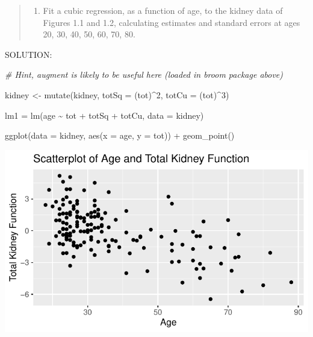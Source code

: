 \documentclass[
]{article}
\newenvironment{Shaded}{\begin{snugshade}}{\end{snugshade}}
\newcommand{\AttributeTok}[1]{\textcolor[rgb]{0.77,0.63,0.00}{#1}}
\newcommand{\CommentTok}[1]{\textcolor[rgb]{0.56,0.35,0.01}{\textit{#1}}}
\newcommand{\DecValTok}[1]{\textcolor[rgb]{0.00,0.00,0.81}{#1}}
\newcommand{\FunctionTok}[1]{\textcolor[rgb]{0.00,0.00,0.00}{#1}}
\newcommand{\NormalTok}[1]{#1}
\newcommand{\OtherTok}[1]{\textcolor[rgb]{0.56,0.35,0.01}{#1}}
\newcommand{\SpecialCharTok}[1]{\textcolor[rgb]{0.00,0.00,0.00}{#1}}
\providecommand{\tightlist}{%
  \setlength{\itemsep}{0pt}\setlength{\parskip}{0pt}}
\begin{document}
\begin{quote}
\begin{enumerate}
\def\labelenumi{(\alph{enumi})}
\tightlist
\item
  Fit a cubic regression, as a function of age, to the kidney data of
  Figures 1.1 and 1.2, calculating estimates and standard errors at ages
  20, 30, 40, 50, 60, 70, 80.
\end{enumerate}
\end{quote}

SOLUTION:

\begin{Shaded}
\begin{Highlighting}[]
\CommentTok{\# Hint, augment is likely to be useful here (loaded in broom package above)}



\NormalTok{kidney }\OtherTok{\textless{}{-}} \FunctionTok{mutate}\NormalTok{(kidney, }\AttributeTok{totSq =}\NormalTok{ (tot)}\SpecialCharTok{\^{}}\DecValTok{2}\NormalTok{, }\AttributeTok{totCu =}\NormalTok{ (tot)}\SpecialCharTok{\^{}}\DecValTok{3}\NormalTok{)}

\NormalTok{lm1 }\OtherTok{=} \FunctionTok{lm}\NormalTok{(age }\SpecialCharTok{\textasciitilde{}}\NormalTok{ tot }\SpecialCharTok{+}\NormalTok{ totSq }\SpecialCharTok{+}\NormalTok{ totCu, }\AttributeTok{data =}\NormalTok{ kidney)}

\FunctionTok{ggplot}\NormalTok{(}\AttributeTok{data =}\NormalTok{ kidney, }\FunctionTok{aes}\NormalTok{(}\AttributeTok{x =}\NormalTok{ age, }\AttributeTok{y =}\NormalTok{ tot)) }\SpecialCharTok{+}
  \FunctionTok{geom\_point}\NormalTok{()}
\end{Highlighting}
\end{Shaded}

\includegraphics{hmk1Stat495F22_files/figure-latex/unnamed-chunk-5-1.pdf}
\end{document}
